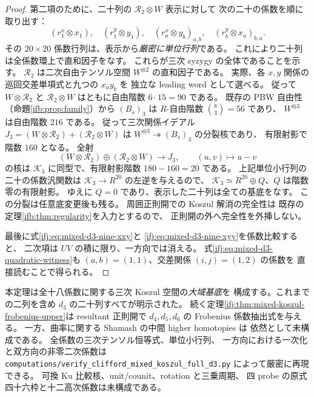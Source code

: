 \begin{proof}
第二項のために、二十列の $\mathcal R_2\otimes W$ 表示に対して
次の二十の係数を順に取り出す：
\[
 (r_1^x\otimes x_1),\quad (r_1^y\otimes y_1),\quad
 (r_a^x\otimes y_b)_{a,b},\quad(r_b^y\otimes x_a)_{b,a}.
\]
その $20\times20$ 係数行列は、表示から\emph{厳密に単位行列}である。
これにより二十列は全係数環上で直和因子をなす。
これらが三次 syzygy の全体であることを示す。
$\mathcal R_2$ は二次自由テンソル空間 $W^{\otimes2}$ の直和因子である。
実際、各 $x,y$ 関係の巡回交差単項式と九つの $x_ay_b$ を
独立な leading word として選べる。
従って $W\otimes\mathcal R_2$ と
$\mathcal R_2\otimes W$ はともに自由階数 $6\cdot15=90$ である。
既存の PBW 自由性（命題\ref{ifb:prop:family}）から
$(B_s)_3$ は $R$-自由階数 $\binom83=56$ であり、
$W^{\otimes3}$ は自由階数 $216$ である。
従って三次関係イデアル
$J_3=(W\otimes\mathcal R_2)+(\mathcal R_2\otimes W)$ は
$W^{\otimes3}\twoheadrightarrow(B_s)_3$ の分裂核であり、
有限射影で階数 $160$ となる。
全射
\[
 (W\otimes\mathcal R_2)\oplus(\mathcal R_2\otimes W)
     \longrightarrow J_3,
     \qquad (u,v)\longmapsto u-v
\]
の核は $\mathcal K_3$ に同型で、有限射影階数
$180-160=20$ である。
上記単位小行列の二十の係数汎関数は
$\mathcal K_3\to R^{20}$ の左逆を与えるので、
$\mathcal K_3\simeq R^{20}\oplus Q$、$Q$ は階数零の有限射影。
ゆえに $Q=0$ であり、表示した二十列は全ての基底をなす。
この分裂は任意底変更後も残る。
周囲正則開での Koszul 解消の完全性は
既存の定理\ref{ifb:thm:regularity}を入力とするので、
正則開の外へ完全性を外挿しない。

最後に式\eqref{ifj:eq:mixed-d3-nine-xxy}と
\eqref{ifj:eq:mixed-d3-nine-xyy}を係数比較すると、
二次項は $UV$ の積に限り、一方向では消える。
式\eqref{ifj:eq:mixed-d3-quadratic-witness}も
$(a,b)=(1,1)$、交差関係 $(i,j)=(1,2)$ の係数を
直接読むことで得られる。
\end{proof}

\begin{remark}[計算した範囲と次の微分]
\label{ifj:rem:mixed-d3-scope}
本定理は全十八係数に関する三次 Koszul 空間の\emph{大域基底}を
構成する。これまでの二列を含め $d_3$ の二十列すべてが明示された。
続く定理\ref{ifj:thm:mixed-koszul-frobenius-upper}は
resultant 正則開で $d_4,d_5,d_6$ の Frobenius 係数抽出式を与える。
一方、曲率に関する Shamash の中間 higher homotopies は
依然として未構成である。
全係数の三次テンソル恒等式、単位小行列、
一方向における一次化と双方向の非零二次係数は
\texttt{computations/verify\_clifford\_mixed\_koszul\_full\_d3.py}
によって厳密に再現できる。
可換 Ku 比較核、unit/counit、rotation と三乗周期、
四 probe の原式四十六枠と十二高次係数は未構成である。
\end{remark}
